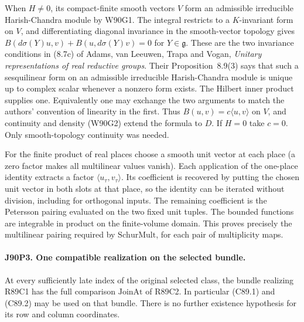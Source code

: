 When $H\ne0$, its compact-finite smooth vectors $V$ form an
admissible irreducible Harish-Chandra module by W90G1. The integral
restricts to a $K$-invariant form on $V$, and differentiating
diagonal invariance in the smooth-vector topology gives
$B(d\sigma(Y)u,v)+B(u,d\sigma(Y)v)=0$ for $Y\in\mathfrak g$.
These are the two invariance conditions in (8.7c) of Adams,
van Leeuwen, Trapa and Vogan, \emph{Unitary representations of real
reductive groups}. Their Proposition~8.9(3) says that such a
sesquilinear form on an admissible irreducible Harish-Chandra
module is unique up to complex scalar whenever a nonzero form
exists. The Hilbert inner product supplies one. Equivalently one may
exchange the two arguments to match the authors' convention of
linearity in the first. Thus $B(u,v)=c\langle u,v\rangle$ on
$V$, and continuity and density (W90G2) extend the formula to $D$.
If $H=0$ take $c=0$. Only smooth-topology continuity was needed.

For the finite product of real places choose a smooth unit vector at
each place (a zero factor makes all multilinear values vanish).
Each application of the one-place identity extracts a factor
$\langle u_\tau,v_\tau\rangle$. Its coefficient is recovered by
putting the chosen unit vector in both slots at that place, so the
identity can be iterated without division, including for orthogonal
inputs. The remaining coefficient is the Petersson pairing evaluated
on the two fixed unit tuples. The bounded functions are integrable
in product on the finite-volume domain. This proves precisely the
multilinear pairing required by $\mathrm{SchurMult}$, for each pair
of multiplicity maps.

\paragraph{J90P3. One compatible realization on the selected bundle.}
At every sufficiently late index of the original selected class,
the bundle realizing R89C1 has the full comparison
$\mathrm{JoinAt}$ of R89C2. In particular (C89.1) and
(C89.2) may be used on that bundle. There is no further existence
hypothesis for its row and column coordinates.

